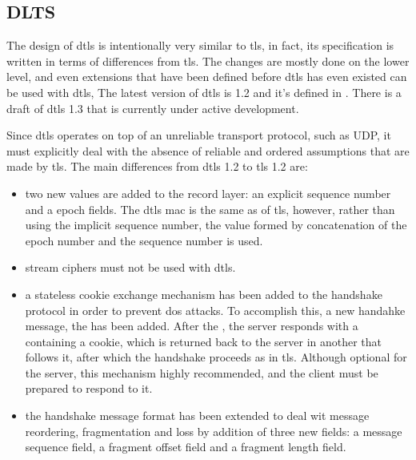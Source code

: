 \documentclass{llncs}
\begin{document}
%
\subsection{DLTS}

The design of \gls{dtls} is intentionally very similar to \gls{tls}, in fact, its specification is written
in terms of differences from \gls{tls}. The changes are mostly done on the lower level,
and even extensions that have been defined before \gls{dtls} has even existed can be
used with \gls{dtls}, The latest version of \gls{dtls} is 1.2 and it's defined
in \cite{RFC6347}. There is a draft of \gls{dtls} 1.3
\cite{I-D.ietf-tls-dtls13} that is currently under active development.

Since \gls{dtls} operates on top of an unreliable transport protocol, such as
UDP, it must explicitly deal with the absence of reliable and ordered assumptions
that are made by \gls{tls}. The main differences from \gls{dtls} 1.2 to \gls{tls} 1.2 are:

\begin{itemize}
  \item two new values are added to the record layer: an explicit  sequence
  number and a  epoch fields. The \gls{dtls} \gls{mac} is the same as of \gls{tls},
  however, rather than using the implicit sequence number, the  value
  formed by concatenation of the epoch number and the sequence number is used.

  \item stream ciphers must not be used with \gls{dtls}.

  \item a stateless cookie exchange mechanism has been added to the handshake protocol
  in order to prevent \gls{dos} attacks. To accomplish this, a new handahke
  message, the  has been added. After
  the , the server responds with a 
  containing a cookie, which is returned back to the server in another
   that follows it, after which the handshake proceeds as in \gls{tls}.
  Although optional for the server, this mechanism highly recommended, and the
  client must be prepared to respond to it.

  \item the handshake message format has been extended to deal wit message reordering,
  fragmentation and loss by addition of three new fields: a message sequence field,
  a fragment offset field and a fragment length field.
\end{itemize}
\end{document}
